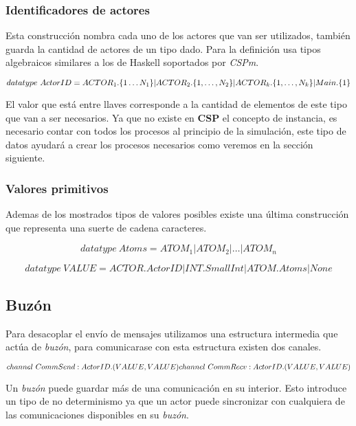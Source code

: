 \documentclass[fleqn]{article}
\begin{document}
\subsubsection{Identificadores de actores}

Esta construcción nombra cada uno de los actores que van ser utilizados, también
guarda la cantidad de actores de un tipo dado. Para la definición usa tipos algebraicos
similares a los de Haskell soportados por \textit{CSPm}.

\[
  datatype\ ActorID = ACTOR_1.\{1 \ldots N_1\} | \\
  ACTOR_2.\{1, \ldots ,N_2\} | \\
  ACTOR_k.\{1, \ldots, N_k\} | \\
  Main.\{1\}
\]

El valor que está entre llaves corresponde a la cantidad de elementos de este
tipo que van a ser necesarios. Ya que no existe en \textbf{CSP} el concepto de
instancia, es necesario contar con todos los procesos al principio de la
simulación, este tipo de datos ayudará a crear los procesos necesarios como
veremos en la sección siguiente.

\subsubsection{Valores primitivos}

Ademas de los mostrados tipos de valores posibles existe una última construcción
que representa una suerte de cadena caracteres.

\[
  datatype\ Atoms = ATOM_1 | ATOM_2 | \ldots | ATOM_n
\]



\[
  datatype\ VALUE = ACTOR.ActorID | INT.SmallInt | ATOM.Atoms | None
\]

\subsection{Buzón}

Para desacoplar el envío de mensajes utilizamos una estructura intermedia que
actúa de \textit{buzón}, para comunicarase con esta estructura existen dos canales.

\[
channel\ CommSend:ActorID.(VALUE, VALUE)\\
channel\ CommRecv:ActorID.(VALUE, VALUE)
\]

Un \textit{buzón} puede guardar más de una comunicación en su interior. Esto
introduce un tipo de no determinismo ya que un actor puede sincronizar con cualquiera
de las comunicaciones disponibles en su \textit{buzón}.
\end{document}
